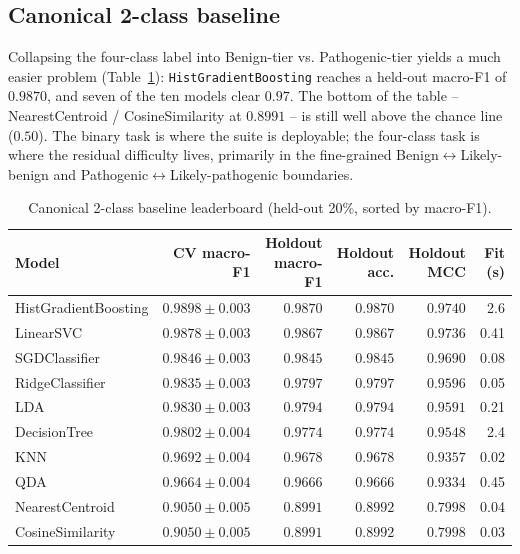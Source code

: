 \documentclass[11pt,a4paper]{article}
\begin{document}
\subsection{Canonical 2-class baseline}
\label{sec:canonical-2class}

Collapsing the four-class label into Benign-tier vs. Pathogenic-tier yields a
much easier problem (Table~\ref{tab:canonical-2class}): \texttt{HistGradientBoosting} reaches a held-out macro-F1 of $0.9870$, and seven of the ten models clear
$0.97$. The bottom of the table -- NearestCentroid / CosineSimilarity at
$0.8991$ -- is still well above the chance line ($0.50$). The binary task is
where the suite is deployable; the four-class task is where the residual
difficulty lives, primarily in the fine-grained Benign$\leftrightarrow$Likely-benign
and Pathogenic$\leftrightarrow$Likely-pathogenic boundaries.

\begin{table}[H]
\centering
\caption{Canonical 2-class baseline leaderboard (held-out 20\%, sorted by macro-F1).}
\label{tab:canonical-2class}
\small
\begin{tabular}{lrrrrr}
\toprule
Model & CV macro-F1 & Holdout macro-F1 & Holdout acc. & Holdout MCC & Fit (s) \\
\midrule
HistGradientBoosting & $0.9898\pm0.003$ & $0.9870$ & $0.9870$ & $0.9740$ & 2.6 \\
LinearSVC & $0.9878\pm0.003$ & $0.9867$ & $0.9867$ & $0.9736$ & 0.41 \\
SGDClassifier & $0.9846\pm0.003$ & $0.9845$ & $0.9845$ & $0.9690$ & 0.08 \\
RidgeClassifier & $0.9835\pm0.003$ & $0.9797$ & $0.9797$ & $0.9596$ & 0.05 \\
LDA & $0.9830\pm0.003$ & $0.9794$ & $0.9794$ & $0.9591$ & 0.21 \\
DecisionTree & $0.9802\pm0.004$ & $0.9774$ & $0.9774$ & $0.9548$ & 2.4 \\
KNN & $0.9692\pm0.004$ & $0.9678$ & $0.9678$ & $0.9357$ & 0.02 \\
QDA & $0.9664\pm0.004$ & $0.9666$ & $0.9666$ & $0.9334$ & 0.45 \\
NearestCentroid & $0.9050\pm0.005$ & $0.8991$ & $0.8992$ & $0.7998$ & 0.04 \\
CosineSimilarity & $0.9050\pm0.005$ & $0.8991$ & $0.8992$ & $0.7998$ & 0.03 \\
\bottomrule
\end{tabular}
\end{table}
\end{document}

